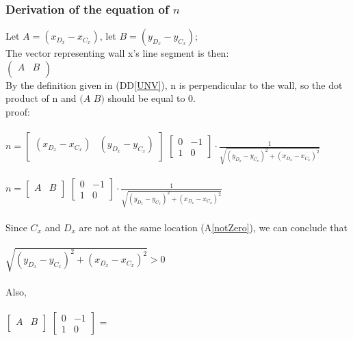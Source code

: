\documentclass[12pt]{article}
\newcommand{\ddref}[1]{DD\ref{#1}}
\newcommand{\aref}[1]{A\ref{#1}}
\begin{document}
\subsubsection*{Derivation of the equation of $n$}
Let $A = (x_{D_x}-x_{C_x})$, let $B = (y_{D_x}-y_{C_x})$;\\
The vector representing wall x's line segment is then:\\
\indent
$\begin{pmatrix}
A & B \\
\end{pmatrix}$\\
By the definition given in (\ddref{UNV}), n is perpendicular to the wall, so the dot product of n and $(A$  $B)$ should be equal to 0.\\
proof:\\
\\
\indent
$n = \begin{bmatrix}
  (x_{D_x}-x_{C_x}) & (y_{D_x}-y_{C_x})\\
  \end{bmatrix}$
  $\begin{bmatrix}
  0 & -1\\
  1 & 0
  \end{bmatrix} \cdot \frac{1}{\sqrt{(y_{D_x}-y_{C_x})^2+(x_{D_x}-x_{C_x})^2}}
  $\\
  \\
  \indent
  $n = \begin{bmatrix}
  A & B\\
  \end{bmatrix}$
  $\begin{bmatrix}
  0 & -1\\
  1 & 0
  \end{bmatrix} \cdot \frac{1}{\sqrt{(y_{D_x}-y_{C_x})^2+(x_{D_x}-x_{C_x})^2}}
  $\\
  \\
  Since $C_x$ and $D_x$ are not at the same location (\aref{notZero}), we can 
  conclude that\\
  \\
  \indent
  $\sqrt{(y_{D_x}-y_{C_x})^2+(x_{D_x}-x_{C_x})^2} > 0$\\
  \\
  Also,\\
  \\
  \indent
  $\begin{bmatrix}
  A & B\\
  \end{bmatrix}$
  $\begin{bmatrix}
  0 & -1\\
  1 & 0
  \end{bmatrix}$ = 
\end{document}
